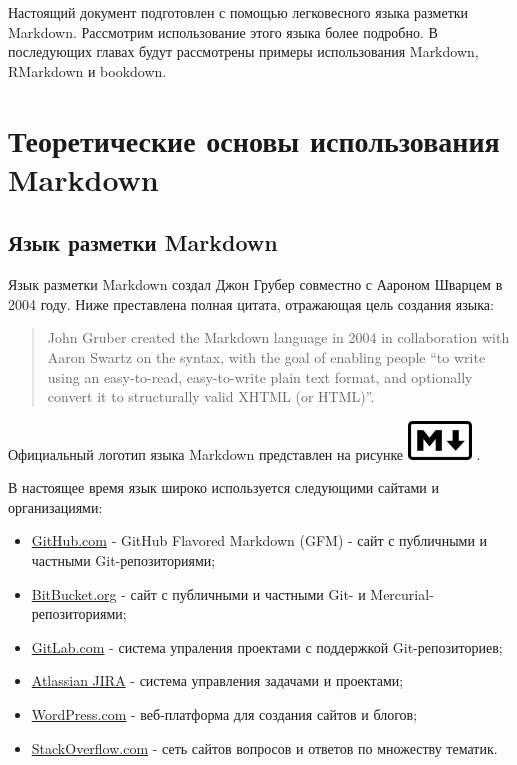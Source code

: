 \documentclass[
  a4paper,
]{book}
\providecommand{\tightlist}{%
  \setlength{\itemsep}{0pt}\setlength{\parskip}{0pt}}
\theoremstyle{definition}
\theoremstyle{definition}
\theoremstyle{definition}
\theoremstyle{definition}
\theoremstyle{remark}
\begin{document}
Настоящий документ подготовлен с помощью легковесного языка разметки Markdown. Рассмотрим использование этого языка более подробно. В последующих главах будут рассмотрены примеры использования Markdown, RMarkdown и bookdown.

\chapter{Теоретические основы использования Markdown}\label{chapter1}

\section{Язык разметки Markdown}\label{markdown-hist}

Язык разметки Markdown создал Джон Грубер совместно с Аароном Шварцем в 2004 году. Ниже преставлена полная цитата, отражающая цель создания языка:

\begin{quote}
John Gruber created the Markdown language in 2004 in collaboration with Aaron Swartz on the syntax, with the goal of enabling people ``to write using an easy-to-read, easy-to-write plain text format, and optionally convert it to structurally valid XHTML (or HTML)''.
\end{quote}

Официальный логотип языка Markdown представлен на рисунке \includegraphics{figures/Markdown-mark.png} .

В настоящее время язык широко используется следующими сайтами и организациями:

\begin{itemize}
\tightlist
\item
  \href{http://github.com}{GitHub.com} - GitHub Flavored Markdown (GFM) - сайт с публичными и частными Git-репозиториями;
\item
  \href{https://bitbucket.org}{BitBucket.org} - сайт с публичными и частными Git- и Mercurial- репозиториями;
\item
  \href{https://about.gitlab.com/}{GitLab.com} - система упраления проектами с поддержкой Git-репозиториев;
\item
  \href{https://www.atlassian.com/software/jira}{Atlassian JIRA} - система управления задачами и проектами;
\item
  \href{https://wordpress.com/}{WordPress.com} - веб-платформа для создания сайтов и блогов;
\item
  \href{https://stackoverflow.com/}{StackOverflow.com} - сеть сайтов вопросов и ответов по множеству тематик.
\end{itemize}
\end{document}
